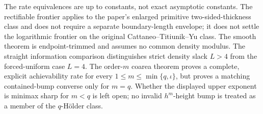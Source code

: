 The rate equivalences are up to constants, not exact asymptotic constants.  The rectifiable frontier applies to the paper's enlarged primitive two-sided-thickness class and does not require a separate boundary-length envelope; it does not settle the logarithmic frontier on the original Cattaneo--Titiunik--Yu class.  The smooth theorem is endpoint-trimmed and assumes no common density modulus.  The straight information comparison distinguishes strict density slack \(L>4\) from the forced-uniform case \(L=4\).  The order-\(m\) coarea theorem proves a complete, explicit achievability rate for every \(1\leq m\leq\min\{q,\iota\}\), but proves a matching contained-bump converse only for \(m=q\).  Whether the displayed upper exponent is minimax sharp for \(m<q\) is left open; no invalid \(h^m\)-height bump is treated as a member of the \(q\)-H\"older class.